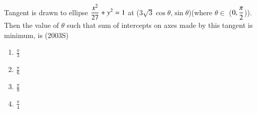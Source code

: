 \documentclass[journal]{IEEEtran}
\begin{document}
\item Tangent is drawn to ellipse $\displaystyle\displaystyle\frac{x^2}{27}+y^2 = 1$ at ($3\sqrt{3}\cos\theta$,$\sin\theta$)(where $\theta \in $ ($0,\displaystyle\displaystyle\frac{\pi}{2}$)). Then the value of $\theta$ such that sum of intercepts on axes made by this tangent is minimum, is
\hfill {(2003S)}
\begin{multicols}{4}
\begin{enumerate}
    \item $\displaystyle\frac{\pi}{3}$\\
    \item $\displaystyle\frac{\pi}{6}$\\
    \item $\displaystyle\frac{\pi}{8}$\\
    \item $\displaystyle\frac{\pi}{4}$\\
 \end{enumerate}
\end{multicols}
\end{document}
